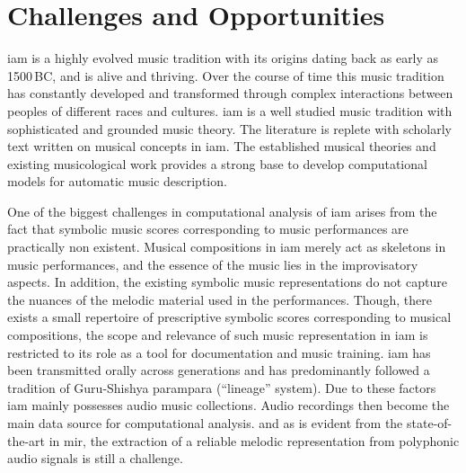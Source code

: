 \section{Challenges and Opportunities}
\label{sec:intro_challenges_oppurtunities}






\Gls{iam} is a highly evolved music tradition with its origins dating back as early as 1500\,BC, and is alive and thriving. Over the course of time this music tradition has constantly developed and transformed through complex interactions between peoples of different races and cultures. \Gls{iam} is a well studied music tradition with sophisticated and grounded music theory. The literature is replete with scholarly text written on musical concepts in \gls{iam}. The established musical theories and existing musicological work provides a strong base to develop computational models for automatic music description. 


One of the biggest challenges in computational analysis of \gls{iam} arises from the fact that symbolic music scores corresponding to music performances are practically non existent. Musical compositions in \gls{iam} merely act as skeletons in music performances, and the essence of the music lies in the improvisatory aspects. In addition, the existing symbolic music representations do not capture the nuances of the melodic material used in the performances. Though, there exists a small repertoire of prescriptive symbolic scores corresponding to musical compositions, the scope and relevance of such music representation in \gls{iam} is restricted to its role as a tool for documentation and music training. \Gls{iam} has been transmitted orally across generations and has predominantly followed a tradition of Guru-Shishya parampara (``lineage'' system).  Due to these factors \gls{iam} mainly possesses audio music collections. Audio recordings then become the main data source for computational analysis. and as is evident from the state-of-the-art in \gls{mir}, the extraction of a reliable melodic representation from polyphonic audio signals is still a challenge. 

